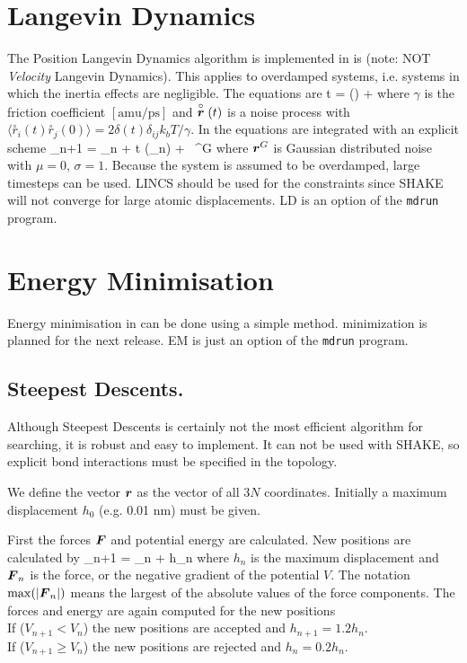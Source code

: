 \section{Langevin Dynamics}
\newcommand{\vrond}{\stackrel{\circ}{\ve{r}}}
\newcommand{\rond}{\stackrel{\circ}{r}}
\newcommand{\ruis}{\ve{r}^G}
\label{sec:LD}
The Position Langevin Dynamics algorithm is implemented in {\gromacs} is 
(note: NOT {\em Velocity} Langevin Dynamics). 
This applies to overdamped systems, 
i.e. systems in which the inertia effects are negligible.
The equations are
\beq
{\de {} \over \de t} = {() \over \gamma} + \vrond
\eeq 
where $\gamma$ is the friction coefficient $[\mbox{amu/ps}]$ and
$\vrond(t)$  is a noise process with 
$\langle \rond_i\!(t) \rond_j\!(0) \rangle = 
    2 \delta(t) \delta_{ij} k_b T / \gamma$.
In {\gromacs} the equations are integrated with an explicit scheme
\beq
{}_{n+1} = _{n} +
	{\Delta t \over \gamma} (_n) 
	+ \, \ruis 
\eeq
where $\ruis$ is  Gaussian distributed noise with $\mu = 0$, $\sigma = 1$.
Because the system is assumed to be overdamped, large timesteps
can be used. LINCS should be used for the constraints since SHAKE
will not converge for large atomic displacements.
LD is an option of the \verb'mdrun' program.

\section{Energy Minimisation}
\label{sec:EM}
Energy minimisation in {\gromacs} can be done using a  simple 
 method. 
 minimization is planned for the
next release. EM is just an option of the \verb'mdrun' program.

\subsection{Steepest Descents.}
Although Steepest Descents is certainly not the most efficient
algorithm for searching, it is robust and easy to implement.
It can not be used with SHAKE, so explicit bond interactions must be
specified in the topology.

We define the vector $\mbox{\boldmath ${r}$}$ as the vector of all $3N$ coordinates.
Initially a maximum displacement $h_0$ (e.g. 0.01 nm) must be given. 

First the forces $\mbox{\boldmath ${F}$}$ and potential energy are calculated.
New positions are calculated by
\beq
{}_{n+1} =	_n +  h_n
\eeq
where $h_n$ is the maximum displacement and $\mbox{\boldmath ${F}$}_n$ is the force,
or the negative gradient of the  potential $V$. The notation $\max
(|\mbox{\boldmath ${F}$}_n|)$ means the largest of the absolute values of the force
components.  The forces and energy are again computed for the new positions \\
If ($V_{n+1} < V_n$) the new positions are accepted and $h_{n+1} = 1.2
h_n$. \\
If ($V_{n+1} \geq V_n$) the new positions are rejected and $h_n = 0.2 h_n$.

